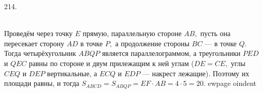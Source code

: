 214. \begin{figure}[ht!]
\end{figure}\\
Проведём через точку $E$ прямую, параллельную стороне $AB,$ пусть она пересекает сторону $AD$ в точке $P,$ а продолжение стороны $BC$ --- в точке $Q.$ Тогда четырёхугольник $ABQP$ является параллелограммом, а треугольники $PED$ и $QEC$ равны по стороне и двум прилежащим к ней углам ($DE=CE,$ углы $CEQ$ и $DEP$ вертикальные, а $ECQ$ и $EDP$ --- накрест лежащие). Поэтому их площади равны, и тогда $S_{ABCD}=S_{ABQP}=EF\cdot AB=4\cdot5=20.$
ewpage
oindent
